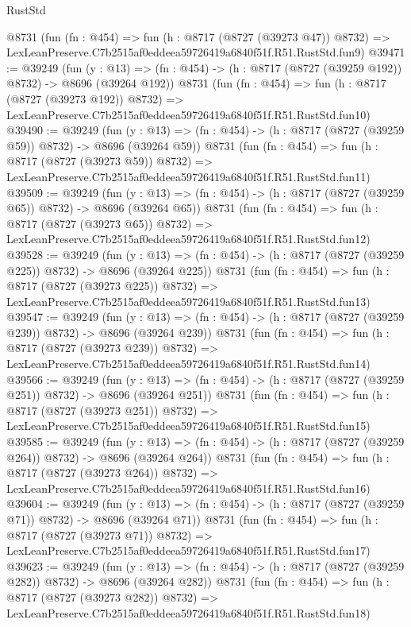 \begin{lexlean}{RustStd}
\begin{coremodule}
    @8731
    (fun (fn : @454) =>
    fun (h : @8717 (@8727 (@39273 @47)) @8732) =>
    LexLeanPreserve.C7b2515af0eddeea59726419a6840f51f.R51.RustStd.fun9)
@39471 := @39249
    (fun (y : @13) => (fn : @454) -> (h : @8717 (@8727 (@39259 @192)) @8732) -> @8696 (@39264 @192))
    @8731
    (fun (fn : @454) =>
    fun (h : @8717 (@8727 (@39273 @192)) @8732) =>
    LexLeanPreserve.C7b2515af0eddeea59726419a6840f51f.R51.RustStd.fun10)
@39490 := @39249
    (fun (y : @13) => (fn : @454) -> (h : @8717 (@8727 (@39259 @59)) @8732) -> @8696 (@39264 @59))
    @8731
    (fun (fn : @454) =>
    fun (h : @8717 (@8727 (@39273 @59)) @8732) =>
    LexLeanPreserve.C7b2515af0eddeea59726419a6840f51f.R51.RustStd.fun11)
@39509 := @39249
    (fun (y : @13) => (fn : @454) -> (h : @8717 (@8727 (@39259 @65)) @8732) -> @8696 (@39264 @65))
    @8731
    (fun (fn : @454) =>
    fun (h : @8717 (@8727 (@39273 @65)) @8732) =>
    LexLeanPreserve.C7b2515af0eddeea59726419a6840f51f.R51.RustStd.fun12)
@39528 := @39249
    (fun (y : @13) => (fn : @454) -> (h : @8717 (@8727 (@39259 @225)) @8732) -> @8696 (@39264 @225))
    @8731
    (fun (fn : @454) =>
    fun (h : @8717 (@8727 (@39273 @225)) @8732) =>
    LexLeanPreserve.C7b2515af0eddeea59726419a6840f51f.R51.RustStd.fun13)
@39547 := @39249
    (fun (y : @13) => (fn : @454) -> (h : @8717 (@8727 (@39259 @239)) @8732) -> @8696 (@39264 @239))
    @8731
    (fun (fn : @454) =>
    fun (h : @8717 (@8727 (@39273 @239)) @8732) =>
    LexLeanPreserve.C7b2515af0eddeea59726419a6840f51f.R51.RustStd.fun14)
@39566 := @39249
    (fun (y : @13) => (fn : @454) -> (h : @8717 (@8727 (@39259 @251)) @8732) -> @8696 (@39264 @251))
    @8731
    (fun (fn : @454) =>
    fun (h : @8717 (@8727 (@39273 @251)) @8732) =>
    LexLeanPreserve.C7b2515af0eddeea59726419a6840f51f.R51.RustStd.fun15)
@39585 := @39249
    (fun (y : @13) => (fn : @454) -> (h : @8717 (@8727 (@39259 @264)) @8732) -> @8696 (@39264 @264))
    @8731
    (fun (fn : @454) =>
    fun (h : @8717 (@8727 (@39273 @264)) @8732) =>
    LexLeanPreserve.C7b2515af0eddeea59726419a6840f51f.R51.RustStd.fun16)
@39604 := @39249
    (fun (y : @13) => (fn : @454) -> (h : @8717 (@8727 (@39259 @71)) @8732) -> @8696 (@39264 @71))
    @8731
    (fun (fn : @454) =>
    fun (h : @8717 (@8727 (@39273 @71)) @8732) =>
    LexLeanPreserve.C7b2515af0eddeea59726419a6840f51f.R51.RustStd.fun17)
@39623 := @39249
    (fun (y : @13) => (fn : @454) -> (h : @8717 (@8727 (@39259 @282)) @8732) -> @8696 (@39264 @282))
    @8731
    (fun (fn : @454) =>
    fun (h : @8717 (@8727 (@39273 @282)) @8732) =>
    LexLeanPreserve.C7b2515af0eddeea59726419a6840f51f.R51.RustStd.fun18)

\end{coremodule}
\end{lexlean}
